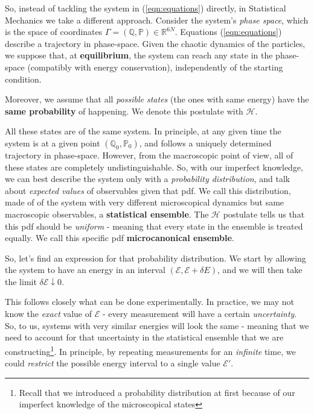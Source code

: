 \documentclass[../../main.tex]{subfiles}
\begin{document}
\medskip

So, instead of tackling the system in (\ref{eqn:equations}) directly, in Statistical Mechanics we take a different approach. Consider the system's \textit{phase space}, which is the space of coordinates $\Gamma = (\mathbb{Q},\mathbb{P}) \in \mathbb{R}^{6N}$. Equations (\ref{eqn:equations}) describe a trajectory in phase-space. Given the chaotic dynamics of the particles, we suppose that, at \textbf{equilibrium}, the system can reach any state in the phase-space (compatibly with energy conservation), independently of the starting condition.

Moreover, we assume that all \textit{possible states} (the ones with same energy) have the \textbf{same probability} of happening. We denote this postulate with $\mathcal{H}$. 

\medskip

All these states are  of the same system. In principle, at any given time the system is at a given point $(\mathbb{Q}_0, \mathbb{P}_0)$, and follows a uniquely determined trajectory in phase-space. However, from the macroscopic point of view, all of these states are completely undistinguishable. So, with our imperfect knowledge, we can best describe the system only with a \textit{probability distribution}, and talk about \textit{expected values} of observables given that pdf. We call this distribution, made of  of the system with very different microscopical dynamics but same macroscopic observables, a \textbf{statistical ensemble}. The $\mathcal{H}$ postulate tells us that this pdf should be \textit{uniform} - meaning that every state in the ensemble is treated equally. We call this specific pdf \textbf{microcanonical ensemble}.   

\medskip

So, let's find an expression for that probability distribution. We start by allowing the system to have an energy in an interval $(\mathcal{E}, \mathcal{E}+\delta E)$, and we will then take the limit $\delta \mathcal{E} \downarrow 0$. 

\medskip

This follows closely what can be done experimentally. In practice, we may not know the \textit{exact} value of $\mathcal{E}$ - every measurement will have a certain \textit{uncertainty}. So, to us, systems with very similar energies will look the same - meaning that we need to account for that uncertainty in the statistical ensemble that we are constructing\footnote{Recall that we introduced a probability distribution at first because of our imperfect knowledge of the microscopical states}. In principle, by repeating measurements for an \textit{infinite} time, we could \textit{restrict} the possible energy interval to a single value $\mathcal{E}'$.
\end{document}
